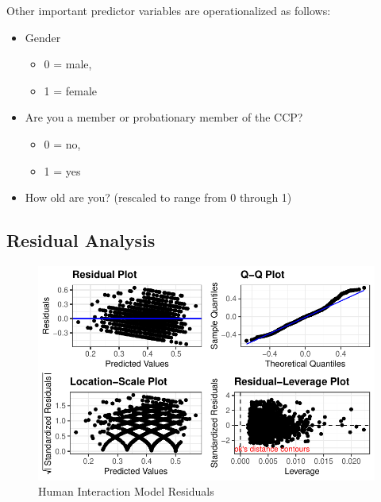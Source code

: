 \documentclass[]{interact}
\theoremstyle{plain}%
\theoremstyle{definition}
\theoremstyle{remark}
\begin{document}
Other important predictor variables are operationalized as follows:

\begin{itemize}
\item
  Gender

  \begin{itemize}
  \item
    0 = male,
  \item
    1 = female
  \end{itemize}
\item
  Are you a member or probationary member of the CCP?

  \begin{itemize}
  \item
    0 = no,
  \item
    1 = yes
  \end{itemize}
\item
  How old are you? (rescaled to range from 0 through 1)
\end{itemize}

\newpage{}

\hypertarget{residual-analysis}{%
\subsection{Residual Analysis}\label{residual-analysis}}

\begin{figure}

{\centering \includegraphics{Social-Isolation-in-China-jg-revised_files/figure-pdf/fig-resids-human-1.pdf}

}

\caption{\label{fig-resids-human}Human Interaction Model Residuals}

\end{figure}
\end{document}
